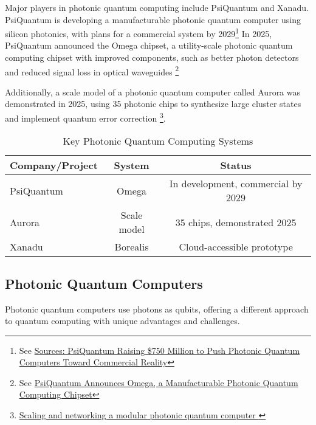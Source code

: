 Major players in photonic quantum computing include PsiQuantum and Xanadu.
PsiQuantum is developing a manufacturable photonic quantum computer using
silicon photonics, with plans for a commercial system by 2029\footnote{See
\href{https://thequantuminsider.com/2025/03/25/sources-psiquantum-raising-750-million-to-push-photonic-quantum-computers-toward-commercial-reality/}{Sources: PsiQuantum Raising \$750 Million to Push Photonic Quantum Computers Toward Commercial Reality}}
In 2025, PsiQuantum announced the Omega chipset, a utility-scale photonic
quantum computing chipset with improved components, such as better photon
detectors and reduced signal loss in optical waveguides
\footnote{See \href{https://thequantuminsider.com/2025/02/26/psiquantum-announces-omega-a-manufacturable-photonic-quantum-computing-chipset/}{PsiQuantum Announces Omega, a Manufacturable Photonic Quantum Computing Chipset}}

\vspace{0.3cm}

Additionally, a scale model of a photonic quantum computer called Aurora was
demonstrated in 2025, using 35 photonic chips to synthesize large cluster
states and implement quantum error correction \footnote{\href{https://www.nature.com/articles/s41586-024-08406-9}{Scaling and networking a modular photonic quantum computer
}}.

\begin{table}[h]
  \centering
  \caption{Key Photonic Quantum Computing Systems}
  \begin{tabular}{|l|c|c|}
    \hline
    \textbf{Company/Project} & \textbf{System} & \textbf{Status} \\
    \hline
    PsiQuantum & Omega & In development, commercial by 2029 \\
    Aurora & Scale model & 35 chips, demonstrated 2025 \\
    Xanadu & Borealis & Cloud-accessible prototype \\
    \hline
  \end{tabular}
\end{table}

\subsection*{Photonic Quantum Computers}

Photonic quantum computers use photons as qubits, offering a different
approach to quantum computing with unique advantages and challenges.


